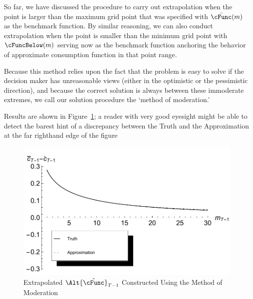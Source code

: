 So far, we have discussed the procedure to carry out extrapolation when the point is larger than the maximum grid point that was specified with $\bar{\cFunc}(m)$ as the benchmark function. By similar reasoning, we can also conduct extrapolation when the point is smaller than the minimum grid point with  $\cFuncBelow(m)$ serving now as the benchmark function anchoring the behavior of approximate consumption function in that point range.


  Because this method relies upon the fact that the problem is easy to
  solve if the decision maker has unreasonable views (either in the
  optimistic or the pessimistic direction), and because the correct
  solution is always between these immoderate extremes, we call our
  solution procedure the `method of moderation.'

  Results are shown in Figure~\ref{fig:ExtrapProblemSolved}; a reader
  with very good eyesight might be able to detect the barest hint of a
  discrepancy between the Truth and the Approximation at the far
  righthand edge of the figure
  \hypertarget{ExtrapProblemSolvedPlot}{}
  \begin{figure}
    \includegraphics{./Figures/ExtrapProblemSolvedPlot}
    \caption{Extrapolated $\Alt{\Hi{\cFunc}}_{T-1}$ Constructed Using the Method of Moderation}
    \label{fig:ExtrapProblemSolved}
  \end{figure}

